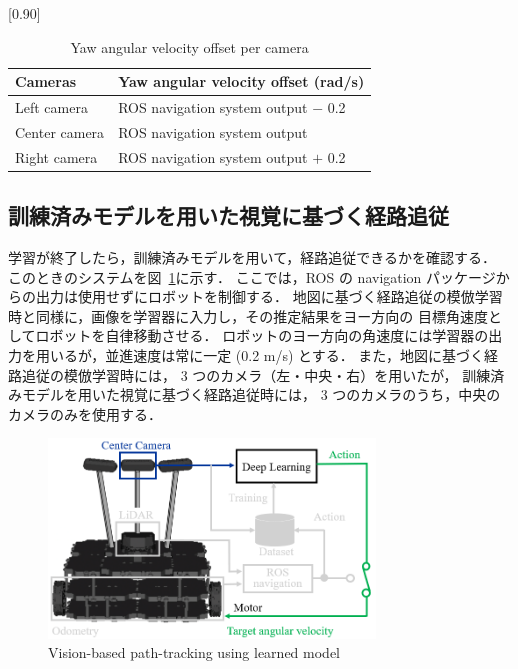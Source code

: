 \documentclass{jarticle}
\renewcommand{\figurename}{図~}
\newcommand{\figref}[1]{\figurename\ref{#1}}
\begin{document}
\vspace*{-3.5mm}

\begin{table}[h!]
  \centering
  \caption{Yaw angular velocity offset per camera}
  \label{table:1}
    \scalebox{0.90}[0.90]{
    \begin{tabular}{|l||l|}
      \hline
      Cameras & Yaw angular velocity offset (rad/s)\\
      \hline\hline
      Left camera & ROS navigation system output $-$ 0.2\\
      \hline
      Center camera & ROS navigation system output\\
      \hline
      Right camera & ROS navigation system output $+$ 0.2\\
      \hline
    \end{tabular} }
\end{table}

\subsection{訓練済みモデルを用いた視覚に基づく経路追従}
学習が終了したら，訓練済みモデルを用いて，経路追従できるかを確認する．
このときのシステムを\figref{fig:4}に示す．
ここでは，ROS の navigation パッケージからの出力は使用せずにロボットを制御する．
地図に基づく経路追従の模倣学習時と同様に，画像を学習器に入力し，その推定結果をヨー方向の
目標角速度としてロボットを自律移動させる．
ロボットのヨー方向の角速度には学習器の出力を用いるが，並進速度は常に一定 (0.2 m/s) とする．
また，地図に基づく経路追従の模倣学習時には， 3 つのカメラ（左・中央・右）を用いたが，
訓練済みモデルを用いた視覚に基づく経路追従時には， 3 つのカメラのうち，中央のカメラのみを使用する．

\begin{figure}[h!]
  \centering
   \includegraphics[height=53mm]{./png/afterlearn.png}
   \caption{Vision-based path-tracking using learned model}
   \label{fig:4}
\end{figure}
\end{document}
